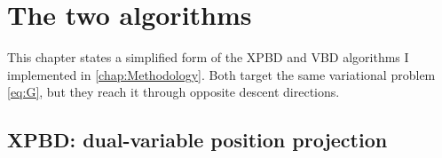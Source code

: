 \chapter{The two algorithms}
\label{chap:Algorithms}

This chapter states a simplified form of the XPBD and VBD algorithms I implemented in
\autoref{chap:Methodology}. Both target the same variational problem \eqref{eq:G},
but they reach it through opposite descent directions.

\section{XPBD: dual-variable position projection}
\label{sec:XPBDAlgo}

